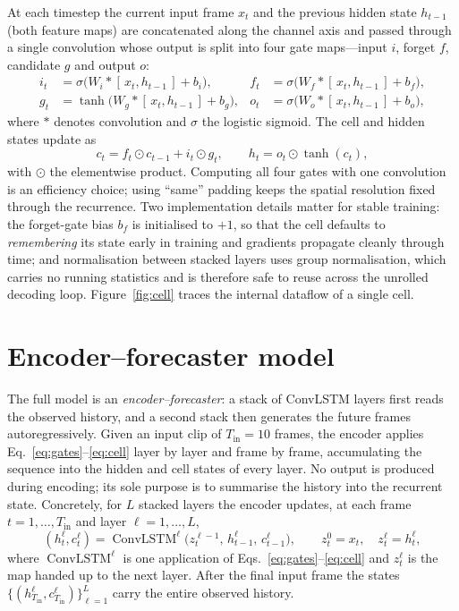 At each timestep the current input frame $x_t$ and the previous hidden state
$h_{t-1}$ (both feature maps) are concatenated along the channel axis and passed
through a single convolution whose output is split into four gate maps---input
$i$, forget $f$, candidate $g$ and output $o$:
\begin{align}
  i_t &= \sigma\!\big(W_i * [\,x_t, h_{t-1}\,] + b_i\big), &
  f_t &= \sigma\!\big(W_f * [\,x_t, h_{t-1}\,] + b_f\big), \nonumber\\
  g_t &= \tanh\!\big(W_g * [\,x_t, h_{t-1}\,] + b_g\big), &
  o_t &= \sigma\!\big(W_o * [\,x_t, h_{t-1}\,] + b_o\big),
  \label{eq:gates}
\end{align}
where $*$ denotes convolution and $\sigma$ the logistic sigmoid. The cell and
hidden states update as
\begin{equation}
  c_t = f_t \odot c_{t-1} + i_t \odot g_t,
  \qquad
  h_t = o_t \odot \tanh(c_t),
  \label{eq:cell}
\end{equation}
with $\odot$ the elementwise product. Computing all four gates with one
convolution is an efficiency choice; using ``same'' padding keeps the spatial
resolution fixed through the recurrence. Two implementation details matter for
stable training: the forget-gate bias $b_f$ is initialised to $+1$, so that the
cell defaults to \emph{remembering} its state early in training and gradients
propagate cleanly through time; and normalisation between stacked layers uses
group normalisation, which carries no running statistics and is therefore safe
to reuse across the unrolled decoding loop. Figure~\ref{fig:cell} traces the
internal dataflow of a single cell.



\section{Encoder--forecaster model}
\label{sec:model}

The full model is an \emph{encoder--forecaster}: a stack of ConvLSTM layers first
reads the observed history, and a second stack then generates the future frames
autoregressively. Given an input clip of $T_{\text{in}}=10$ frames, the encoder
applies Eq.~\eqref{eq:gates}--\eqref{eq:cell} layer by layer and frame by frame,
accumulating the sequence into the hidden and cell states of every layer. No
output is produced during encoding; its sole purpose is to summarise the history
into the recurrent state. Concretely, for $L$ stacked layers the encoder updates,
at each frame $t=1,\dots,T_{\text{in}}$ and layer $\ell=1,\dots,L$,
\begin{equation}
  (h^{\ell}_t, c^{\ell}_t) = \operatorname{ConvLSTM}^{\ell}\!\big(z^{\ell-1}_t,\,
    h^{\ell}_{t-1},\, c^{\ell}_{t-1}\big),
  \qquad z^{0}_t = x_t,\quad z^{\ell}_t = h^{\ell}_t,
  \label{eq:encoder}
\end{equation}
where $\operatorname{ConvLSTM}^{\ell}$ is one application of
Eqs.~\eqref{eq:gates}--\eqref{eq:cell} and $z^{\ell}_t$ is the map handed up to the
next layer. After the final input frame the states
$\{(h^{\ell}_{T_{\text{in}}}, c^{\ell}_{T_{\text{in}}})\}_{\ell=1}^{L}$ carry the
entire observed history.

